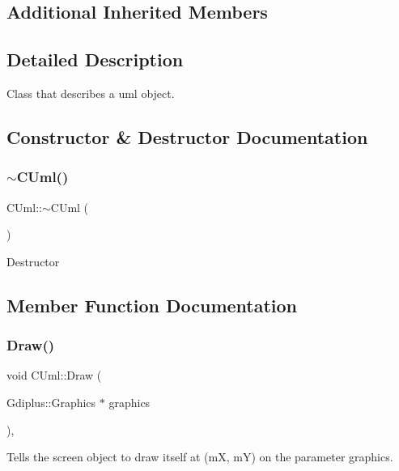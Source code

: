 \subsection*{Additional Inherited Members}


\subsection{Detailed Description}
Class that describes a uml object. 

\subsection{Constructor \& Destructor Documentation}
\mbox{\label{class_c_uml_ae973a18d9ff708dd9dfd26ba5d44061f}} 
\subsubsection{\texorpdfstring{$\sim$CUml()}{~CUml()}}
{\footnotesize\ttfamily C\+Uml\+::$\sim$\+C\+Uml (\begin{DoxyParamCaption}{ }\end{DoxyParamCaption})\hspace{0.3cm}{\ttfamily [virtual]}}

Destructor 

\subsection{Member Function Documentation}
\mbox{\label{class_c_uml_a6c376484d055c37fdcc887eda97a61a3}} 
\subsubsection{\texorpdfstring{Draw()}{Draw()}}
{\footnotesize\ttfamily void C\+Uml\+::\+Draw (\begin{DoxyParamCaption}\item[{Gdiplus\+::\+Graphics $\ast$}]{graphics }\end{DoxyParamCaption})\hspace{0.3cm}{\ttfamily [override]}, {\ttfamily [virtual]}}



Tells the screen object to draw itself at (mX, mY) on the parameter graphics. 

